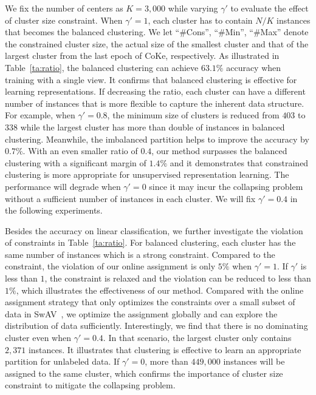 \documentclass[10pt,twocolumn,letterpaper]{article}
\begin{document}
We fix the number of centers as $K=3,000$ while varying $\gamma'$ to evaluate the effect of cluster size constraint. When $\gamma'=1$, each cluster has to contain $N/K$ instances that becomes the balanced clustering. We let ``\#Cons'', ``\#Min'', ``\#Max'' denote the constrained cluster size, the actual size of the smallest cluster and that of the largest cluster from the last epoch of CoKe, respectively. As illustrated in Table~\ref{ta:ratio}, the balanced clustering can achieve $63.1\%$ accuracy when training with a single view. It confirms that balanced clustering is effective for learning representations. If decreasing the ratio, each cluster can have a different number of instances that is more flexible to capture the inherent data structure. For example, when $\gamma'=0.8$, the minimum size of clusters is reduced from $403$ to $338$ while the largest cluster has more than double of instances in balanced clustering. Meanwhile, the imbalanced partition helps to improve the accuracy by $0.7\%$. With an even smaller ratio of $0.4$, our method surpasses the balanced clustering with a significant margin of $1.4\%$ and it demonstrates that constrained clustering is more appropriate for unsupervised representation learning. The performance will degrade when $\gamma'=0$ since it may incur the collapsing problem without a sufficient number of instances in each cluster. We will fix $\gamma'=0.4$ in the following experiments.  

Besides the accuracy on linear classification, we further investigate the violation of constraints in Table~\ref{ta:ratio}. For balanced clustering, each cluster has the same number of instances which is a strong constraint. Compared to the constraint, the violation of our online assignment is only $5\%$ when $\gamma'=1$. If $\gamma'$ is less than $1$, the constraint is relaxed and the violation can be reduced to less than $1\%$, which illustrates the effectiveness of our method. Compared with the online assignment strategy that only optimizes the constraints over a small subset of data in SwAV~\cite{CaronMMGBJ20}, we optimize the assignment globally and can explore the distribution of data sufficiently. Interestingly, we find that there is no dominating cluster even when $\gamma'=0.4$. In that scenario, the largest cluster only contains $2,371$ instances. It illustrates that clustering is effective to learn an appropriate partition for unlabeled data. If $\gamma'=0$, more than $449,000$ instances will be assigned to the same cluster, which confirms the importance of cluster size constraint to mitigate the collapsing problem. 
\end{document}
